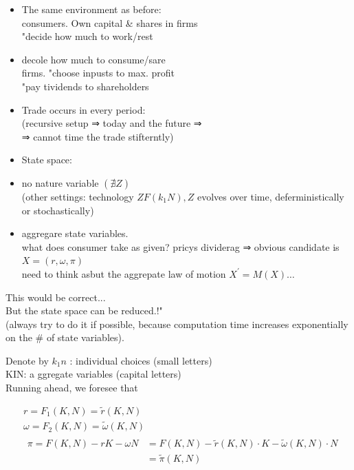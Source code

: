 \documentclass[10pt]{article}
\begin{document}
\begin{itemize}
  \item The same environment as before:\\
consumers. Own capital \& shares in firms\\
"decide how much to work/rest
  \item decole how much to consume/sare\\
firms. "choose inpusts to max. profit\\
"pay tividends to shareholders
  \item Trade occurs in every period:\\
(recursive setup ⇒ today and the future ⇒\\
⇒ cannot time the trade stifterntly)
  \item State space:
  \item no nature variable $(\nexists Z)$\\
(other settings: technology $Z F\left(k_{1} N\right), Z$ evolves over time, deferministically or stochastically)
  \item aggregare state variables.\\
what does consumer take as given? pricys dividerag ⇒ obvious candidate is\\
$X=(r, \omega, \pi)$\\
need to think asbut the aggrepate law of motion $X^{\prime}=M(X) \ldots$
\end{itemize}

This would be correct...\\
But the state space can be reduced.!"\\
(always try to do it if possible, because computation time increases exponentially on the \# of state variables).

Denote by $k_{1} n$ : individual choices (small letters)\\
KIN: a ggregate variables (capital letters)\\
Running ahead, we foresee that

$$
\begin{aligned}
& r=F_{1}(K, N)=\tilde{r}(K, N) \\
& \omega=F_{2}(K, N)=\tilde{\omega}(K, N) \\
& \begin{aligned}
\pi=F(K, N)-r K-\omega N & =F(K, N)-\tilde{r}(K, N) \cdot K-\tilde{\omega}(K, N) \cdot N \\
& =\tilde{\pi}(K, N)
\end{aligned}
\end{aligned}
$$
\end{document}
